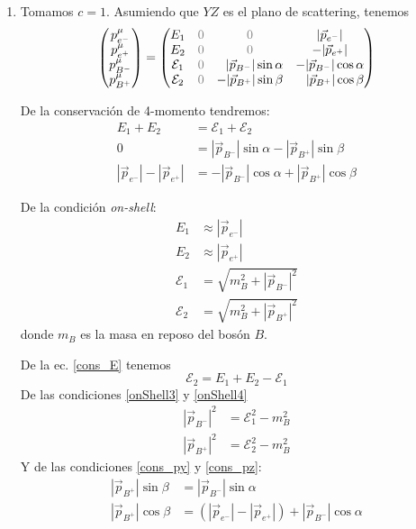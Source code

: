 \documentclass[]{article}
\numberwithin{equation}{section}
\newcommand{\0}{\textcolor{gray}{0}}
\begin{document}
\begin{enumerate}
	\item[a)] Tomamos \(c = 1\). Asumiendo que \(YZ\) es el plano de scattering, tenemos
	\begin{equation}
		\begin{pmatrix}
			p^{\mu}_{e^{-}}\\
			p^{\mu}_{e^{+}}\\
			p^{\mu}_{B^{-}}\\
			p^{\mu}_{B^{+}}
		\end{pmatrix} = \begin{pmatrix}
			E_{1} 			& \0 & \0 								& |\vec{p}_{e^{-}}|\\
			E_{2} 			& \0 & \0 								& -|\vec{p}_{e^{+}}|\\
			\mathcal{E}_{1} & \0 & \hfill|\vec{p}_{B^{-}}|\sin\alpha	& -|\vec{p}_{B^{-}}|\cos\alpha\\
			\mathcal{E}_{2} & \0 & -|\vec{p}_{B^{+}}|\sin\beta 		& \hfill|\vec{p}_{B^{+}}|\cos\beta
		\end{pmatrix}
	\end{equation}
	
	De la conservación de 4-momento tendremos:
	\begin{align}
		E_{1} + E_{2} &= \mathcal{E}_{1} + \mathcal{E}_{2} \label{cons_E}\\
		0 &= |\vec{p}_{B^{-}}|\sin\alpha - |\vec{p}_{B^{+}}|\sin\beta \label{cons_py}\\
		|\vec{p}_{e^{-}}| - |\vec{p}_{e^{+}}| &= - |\vec{p}_{B^{-}}|\cos\alpha + |\vec{p}_{B^{+}}|\cos\beta\label{cons_pz}
	\end{align}
	
	De la condición \textit{on-shell}:
	\begin{align}
		E_{1} &\approx |\vec{p}_{e^{-}}| \label{onShell1}\\
		E_{2} &\approx |\vec{p}_{e^{+}}| \label{onShell2}\\
		\mathcal{E}_{1} &= \sqrt{m_{B}^2 + |\vec{p}_{B^{-}}|^2} \label{onShell3}\\
		\mathcal{E}_{2} &= \sqrt{m_{B}^2 + |\vec{p}_{B^{+}}|^2} \label{onShell4}
	\end{align}
	donde \(m_{B}\) es la masa en reposo del bosón \(B\).
	
	De la ec. \ref{cons_E} tenemos
	\begin{equation}
		\mathcal{E}_{2} = E_{1} + E_{2} -\mathcal{E}_{1} \label{E4}
	\end{equation}
	De las condiciones \ref{onShell3} y \ref{onShell4}
	\begin{align}
		|\vec{p}_{B^{-}}|^2 &= \mathcal{E}_{1}^2 - m_{B}^2 \label{p3^2}\\
		|\vec{p}_{B^{+}}|^2 &= \mathcal{E}_{2}^2 - m_{B}^2 \label{p4^2}
	\end{align}
	Y de las condiciones \ref{cons_py} y \ref{cons_pz}:
	\begin{align}
		|\vec{p}_{B^{+}}|\sin\beta &= |\vec{p}_{B^{-}}|\sin\alpha \label{sinBeta} \\
		|\vec{p}_{B^{+}}|\cos\beta &= (|\vec{p}_{e^{-}}| - |\vec{p}_{e^{+}}|) + |\vec{p}_{B^{-}}|\cos\alpha \label{cosBeta}
	\end{align}
	

\end{enumerate}
\end{document}
